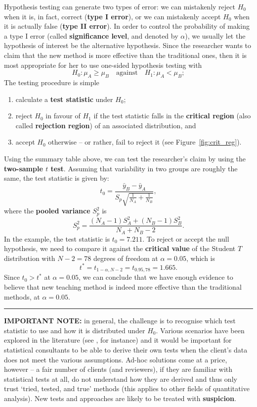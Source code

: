 \par Hypothesis testing can generate two types of error: we can mistakenly reject $H_0$ when it is, in fact, correct (\textbf{type I error}), or we can mistakenly accept $H_{0}$ when it is actually false (\textbf{type II error}). In order to control the probability of making a type I error (called \textbf{significance level}, and denoted by $\alpha$), we usually let the hypothesis of interest be the alternative hypothesis.
\newl Since the researcher wants to claim that the new method is more effective than the traditional ones, then it is most appropriate for her to use one-sided hypothesis testing with $$H_{0}: \mu_{A} \geq \mu_{B} \quad\mbox{against}\quad H_{1}: \mu_{A} < \mu_{B};$$ The testing procedure is simple
\begin{enumerate}[noitemsep]
\item calculate a \textbf{test statistic} under $H_0$;
\item reject $H_0$ in favour of $H_1$ if the test statistic falls in the \textbf{critical region} (also called \textbf{rejection region}) of an associated distribution, and 
\item accept $H_0$ otherwise -- or rather, fail to reject it (see Figure~\ref{fig:crit_reg}).
\end{enumerate}
Using the summary table above, we can test the researcher's claim by using the \textbf{two-sample $t$ test}. Assuming that variability in two groups are roughly the same, the test statistic is given by:
\begin{equation*}
    t_{0}=\frac{\bar{y}_{B}-\bar{y}_{A}}{S_{p}\sqrt{\frac{1}{N_{A}}+\frac{1}{N_{B}}}},
\end{equation*}
where the \textbf{pooled variance} $S^{2}_{p}$ is
\begin{equation*}
    S^{2}_{p}=\frac{(N_{A}-1)S^{2}_{A}+(N_{B}-1)S^{2}_{B}}{N_{A}+N_{B}-2}.
\end{equation*}
In the example, the test statistic is $t_{0} = 7.211$. To reject or accept the null hypothesis, we need to compare it against the \textbf{critical value} of the Student $T$ distribution with $N-2=78$ degrees of freedom at $\alpha=0.05$, which is $$t^*= t_{1-\alpha, N-2}=t_{0.95, 78}=1.665.$$ Since $t_{0} > t^*$ at $\alpha=0.05$, we can conclude that we have enough evidence to believe that new teaching method is indeed more effective than the traditional methods, at $\alpha=0.05$.
\begin{center}
    \rule{0.5\textwidth}{.4pt}
\end{center} \noindent \textbf{IMPORTANT NOTE:} in general, the challenge is to recognise which test statistic to use and how it is distributed under $H_0$. Various scenarios have been explored in the literature (see \cite{SA_KNNL}, for instance) and it would be important for statistical consultants to be able to derive their own tests when the client's data does not meet the various assumptions. Ad-hoc solutions come at a price, however -- a fair number of clients (and reviewers), if they are familiar with statistical tests at all, do not understand how they are derived and thus only trust `tried, tested, and true' methods (this applies to other fields of quantitative analysis). New tests and approaches are likely to be treated with \textbf{suspicion}.   
